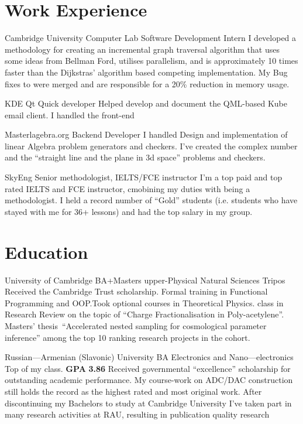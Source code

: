 \documentclass{CurriculumVitae}[10pt, draft, condensed]
\begin{document}
 \section*{Work Experience} {\setlength{\parindent}{0in}
   

    {Cambridge University Computer Lab}
   {Software Development Intern} {I developed a methodology for
     creating an incremental graph traversal algorithm that uses some
     ideas from Bellman Ford, utilises parallelism, and is
     approximately 10 times faster than the Dijkstras' algorithm based
     competing implementation. My Bug fixes to  were
     merged and are responsible for a 20\% reduction in memory
     usage. }


   {KDE}
   {Qt Quick developer} {Helped develop and document the QML-based Kube email client. I handled the  front-end }


    {Masterlagebra.org} {Backend Developer} {I
     handled Design and implementation of linear Algebra problem
     generators and checkers. I've created the complex number
     and the ``straight line and the plane in 3d space'' problems and
     checkers. }

 {SkyEng} {Senior methodologist, IELTS/FCE
     instructor} {I'm a top paid and top rated IELTS and FCE
     instructor, cmobining my duties with being a methodologist. I
     held a record number of ``Gold'' students (i.e. students who have
     stayed with me for 36+ lessons) and had the top salary in my
     group. }



\section*{Education}

 {University of Cambridge} {BA+Masters
  upper-}{Physical Natural Sciences Tripos} {Received the
  Cambridge Trust scholarship. Formal training in Functional
  Programming and OOP.\@ Took optional courses in Theoretical
  Physics.  class in Research Review on the topic of ``Charge
  Fractionalisation in Poly-acetylene''. Masters' thesis~\cite{cpi}``Accelerated
  nested sampling for cosmological parameter inference'' among the top
  10 ranking research projects in the cohort. }

 {Russian---Armenian (Slavonic) University} {BA
  }{Electronics and Nano---electronics} {Top of my
  class. \textbf{GPA} \textbf{3.86} Received governmental
  ``excellence'' scholarship for outstanding academic performance. My
  course-work on ADC/DAC construction still holds the record as the
  highest rated and most original work. After discontinuing my
  Bachelors to study at Cambridge University I've taken part in many
  research activities at RAU, resulting in publication quality
  research~\cite{cu2o,measurement}}

}
\end{document}
